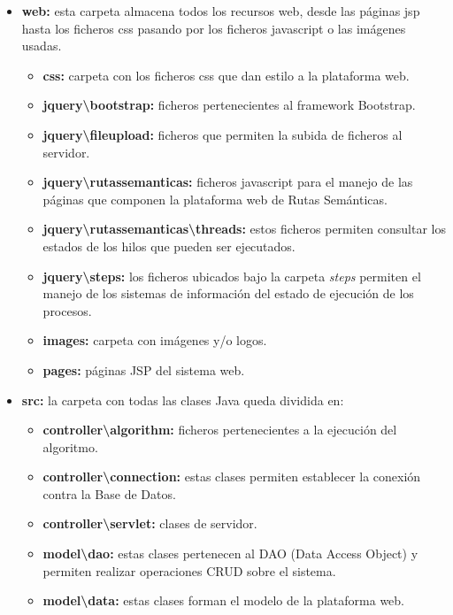 \begin{itemize}
	\item \textbf{web:} esta carpeta almacena todos los recursos web, desde las páginas jsp hasta los ficheros css pasando por los ficheros javascript o las imágenes usadas.
	\begin{itemize}
		\item \textbf{css:} carpeta con los ficheros css que dan estilo a la plataforma web.
		\item \textbf{jquery\textbackslash bootstrap:} ficheros pertenecientes al framework Bootstrap.
		\item \textbf{jquery\textbackslash fileupload:} ficheros que permiten la subida de ficheros al servidor.
		\item \textbf{jquery\textbackslash rutassemanticas:} ficheros javascript para el manejo de las páginas que componen la plataforma web de Rutas Semánticas.
		\item \textbf{jquery\textbackslash rutassemanticas\textbackslash threads:} estos ficheros permiten consultar los estados de los hilos que pueden ser ejecutados.
		\item \textbf{jquery\textbackslash steps:} los ficheros ubicados bajo la carpeta \textit{steps} permiten el manejo de los sistemas de información del estado de ejecución de los procesos.
		\item \textbf{images:} carpeta con imágenes y/o logos.
		\item \textbf{pages:} páginas JSP del sistema web.
	\end{itemize}
	\item \textbf{src:} la carpeta con todas las clases Java queda dividida en:
	\begin{itemize}
		\item \textbf{controller\textbackslash algorithm:} ficheros pertenecientes a la ejecución del algoritmo.
		\item \textbf{controller\textbackslash connection:} estas clases permiten establecer la conexión contra la Base de Datos.
		\item \textbf{controller\textbackslash servlet:} clases de servidor.
		\item \textbf{model\textbackslash dao:} estas clases pertenecen al DAO (Data Access Object) y permiten realizar operaciones CRUD sobre el sistema.
		\item \textbf{model\textbackslash data:} estas clases forman el modelo de la plataforma web.
	\end{itemize}
\end{itemize}

